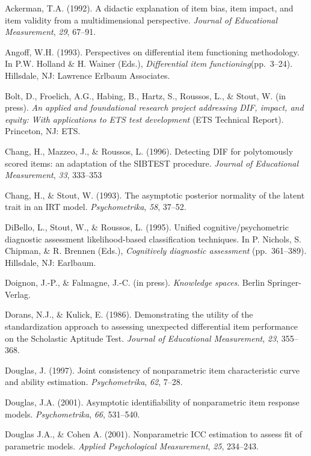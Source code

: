 \documentclass[titlepage,11pt,twoside]{article}
\begin{document}
\begin{thebibliography}

\bibitem Ackerman, T.A. (1992). A didactic explanation of item bias, item impact, and item validity from a multidimensional perspective. \textit{Journal of Educational Measurement}, \textit{29}, 67--91.

\bibitem Angoff, W.H. (1993). Perspectives on differential item functioning methodology. In P.W. Holland \& H. Wainer (Eds.), \textit{Differential item functioning}(pp.~3--24). Hillsdale, NJ: Lawrence Erlbaum Associates.

\bibitem Bolt, D., Froelich, A.G., Habing, B., Hartz, S., Roussos, L., \& Stout, W. (in press). \textit{An applied and foundational research project addressing DIF, impact, and equity: With applications to ETS test development} (ETS Technical Report). Princeton, NJ: ETS.

Chang, H., Mazzeo, J., \& Roussos, L. (1996). Detecting DIF for polytomously scored items: an adaptation of the SIBTEST procedure. \textit{Journal of Educational Measurement}, \textit{33}, 333--353

\bibitem Chang, H., \& Stout, W. (1993). The asymptotic posterior normality of the latent trait in an IRT model. \textit{Psychometrika}, \textit{58}, 37--52.


\bibitem DiBello, L., Stout, W., \& Roussos, L. (1995). Unified cognitive/psychometric diagnostic assessment likelihood-based classification techniques. In P. Nichols, S. Chipman, \& R. Brennen (Eds.), \textit{Cognitively diagnostic assessment} (pp.~361--389). Hillsdale, NJ: Earlbaum.

\bibitem Doignon, J.-P., \& Falmagne, J.-C. (in press). \textit{Knowledge spaces}. Berlin Springer-Verlag.

\bibitem Dorans, N.J., \& Kulick, E. (1986). Demonstrating the utility of the standardization approach to assessing unexpected differential item performance on the Scholastic Aptitude Test. \textit{Journal of Educational Measurement}, \textit{23}, 355--368.

\bibitem Douglas, J. (1997). Joint consistency of nonparametric item characteristic curve and ability estimation. \textit{Psychometrika}, \textit{62}, 7--28.

\bibitem Douglas, J.A. (2001). Asymptotic identifiability of nonparametric item response models. \textit{Psychometrika}, \textit{66}, 531--540.

\bibitem Douglas J.A., \& Cohen A. (2001). Nonparametric ICC estimation to assess fit of parametric models. \textit{Applied Psychological Measurement}, \textit{25}, 234--243.


\end{thebibliography}
\end{document}
